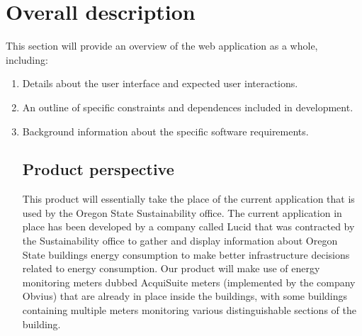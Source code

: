 \documentclass[onecolumn, draftclsnofoot,10pt, compsoc]{IEEEtran}
\begin{document}
    \section{Overall description}
    This section will provide an overview of the web application as a whole, including:
        \begin{enumerate} 
            \item Details about the user interface and expected user interactions.
            \item An outline of specific constraints and dependences included in development. 
            \item Background information about the specific software requirements.

    \subsection{Product perspective}

    This product will essentially take the place of the current application that is used by the Oregon State Sustainability office. The current application in place has been developed by a company called Lucid that was contracted by the Sustainability office to gather and display information about Oregon State buildings energy consumption to make better infrastructure decisions related to energy consumption. Our product will make use of energy monitoring meters dubbed AcquiSuite meters (implemented by the company Obvius) that are already in place inside the buildings, with some buildings containing multiple meters monitoring various distinguishable sections of the building.
    

\end{enumerate}
\end{document}
